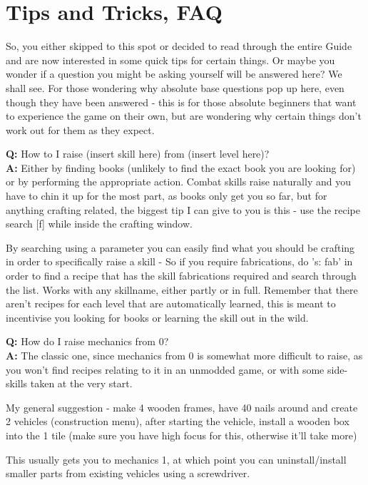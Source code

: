 \chapter{Tips and Tricks, FAQ}

So, you either skipped to this spot or decided to read through the entire Guide and are now interested in some quick tips for certain things. Or maybe you wonder if a question you might be asking yourself will be answered here? We shall see. For those wondering why absolute base questions pop up here, even though they have been answered - this is for those absolute beginners that want to experience the game on their own, but are wondering why certain things don't work out for them as they expect.

\textbf{Q:} How to I raise (insert skill here) from (insert level here)?\\
\textbf{A:} Either by finding books (unlikely to find the exact book you are looking for) or by performing the appropriate action. Combat skills raise naturally and you have to chin it up for the most part, as books only get you so far, but for anything crafting related, the biggest tip I can give to you is this - use the recipe search [f] while inside the crafting window.

By searching using a parameter you can easily find what you should be crafting in order to specifically raise a skill - So if you require fabrications, do 's: fab' in order to find a recipe that has the skill fabrications required and search through the list. Works with any skillname, either partly or in full. Remember that there aren't recipes for each level that are automatically learned, this is meant to incentivise you looking for books or learning the skill out in the wild.

\textbf{Q:} How do I raise mechanics from 0?\\
\textbf{A:} The classic one, since mechanics from 0 is somewhat more difficult to raise, as you won't find recipes relating to it in an unmodded game, or with some side-skills taken at the very start.

My general suggestion - make 4 wooden frames, have 40 nails around and create 2 vehicles (construction menu), after starting the vehicle, install a wooden box into the 1 tile (make sure you have high focus for this, otherwise it'll take more)

This usually gets you to mechanics 1, at which point you can uninstall/install smaller parts from existing vehicles using a screwdriver.

